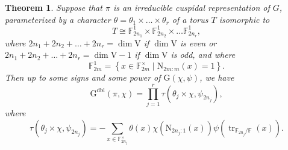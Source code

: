 \documentclass[12pt, reqno]{amsart}
\newtheorem{theorem}{Theorem}[section]
\theoremstyle{definition}
\theoremstyle{definition}
\theoremstyle{definition}
\newcommand{\multiplicativegroup}[1]{#1^{\times}}
\newcommand{\hermitianSpace}{\mathrm{V}}
\newcommand{\fieldCharacter}{\psi}
\newcommand{\trace}{\operatorname{tr}}
\newcommand{\FieldNorm}[2]{\mathrm{N}_{#1:#2}}
\newcommand{\finiteField}{\mathbb{F}}
\newcommand{\finiteFieldExtension}[1]{\finiteField_{#1}}
\newcommand{\GaussSumScalar}[2]{\mathrm{G}\left(#1, #2\right)}
\newcommand{\dblGaussSumScalar}[2]{\mathrm{G}^{\mathrm{dbl}}\left(#1, #2\right)}
\begin{document}
\begin{theorem}
	Suppose that $\pi$ is an irreducible cuspidal representation of $G$, parameterized by a character $\theta = \theta_1 \times \dots \times \theta_r$ of a torus $T$ isomorphic to $$T \cong \finiteFieldExtension{2n_1}^1 \times \finiteFieldExtension{2n_2}^1 \times \dots \finiteFieldExtension{2n_r}^1,$$
	where $2n_1 + 2n_2 + \dots + 2n_r = \dim \hermitianSpace$ if $\dim \hermitianSpace$ is even or $2n_1 + 2n_2 + \dots + 2n_r = \dim \hermitianSpace - 1$ if $\dim \hermitianSpace$ is odd, and where $$\finiteFieldExtension{2m}^1 = \left\{ x \in \multiplicativegroup{\finiteFieldExtension{2m}} \mid \FieldNorm{2m}{m}\left(x\right)= 1\right\}.$$
	Then up to some signs and some power of $\GaussSumScalar{\chi}{\fieldCharacter}$, we have $$\dblGaussSumScalar{\pi}{\chi}= \prod_{j=1}^r \tau\left( \theta_j \times \chi, \fieldCharacter_{2n_j} \right),$$
	where $$\tau\left( \theta_j \times \chi, \fieldCharacter_{2n_j}\right) = -\sum_{x \in \multiplicativegroup{\finiteFieldExtension{2n_j}}} \theta\left(x\right) \chi\left(\FieldNorm{2n_j}{1}\left(x\right)\right)\fieldCharacter\left(\trace_{\finiteFieldExtension{2n_j} \slash \finiteField}\left(x\right)\right).$$
\end{theorem}



\end{document}
